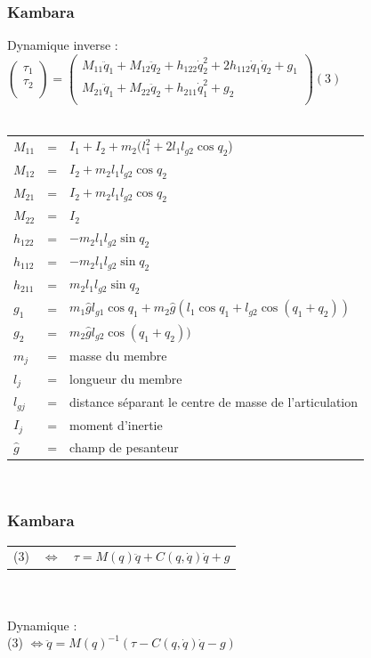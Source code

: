 \documentclass{beamer}
\begin{document}
\begin{frame}
\frametitle{Kambara}
Dynamique inverse : \\
$
\begin{pmatrix}
    \tau_1 \\
    \tau_2 \\
\end{pmatrix}
=
\begin{pmatrix}
    M_{11}\ddot{q}_1 + M_{12}\ddot{q}_2 + h_{122}\dot{q}_2^2 + 2h_{112}\dot{q}_1\dot{q}_2 + g_1 \\
    M_{21}\ddot{q}_1 + M_{22}\ddot{q}_2 + h_{211}\dot{q}_1^2 + g_2 \\
\end{pmatrix}
(3)$\\
~\\
\begin{tabular}{lcl}
    $M_{11}$ & = & $I_1 + I_2 + m_2(l_1^2 + 2 l_1 l_{g2}\cos q_2$) \\
    $M_{12}$ & = & $I_2 + m_2l_1l_{g2}\cos q_2$ \\
    $M_{21}$ & = & $I_2 + m_2l_1l_{g2}\cos q_2$ \\
    $M_{22}$ & = & $I_2$ \\
    $h_{122}$ & = & $-m_2 l_1 l_{g2} \sin q_2$ \\
    $h_{112}$ & = & $-m_2 l_1 l_{g2} \sin q_2$ \\
    $h_{211}$ & = & $m_2 l_1 l_{g2} \sin q_2$ \\
    $g_1$ & = & $m_1 \hat{g} l_{g1} \cos q_1 + m_2 \hat{g} (l_1 \cos q_1 + l_{g2} \cos(q_1 + q_2))$ \\
    $g_2$ & = & $m_2 \hat{g} l_{g2} \cos(q_1 + q_2))$ \\
    $m_j$ & = & masse du membre \\
    $l_j$ & = & longueur du membre \\
    $l_{gj}$ & = & distance séparant le centre de masse de l'articulation \\
    $I_{j}$ & = & moment d'inertie \\
    $\hat{g}$ & = & champ de pesanteur \\
\end{tabular}\\
\end{frame}

\begin{frame}
\frametitle{Kambara}
\begin{tabular}{lcl}
    (3) & $\Leftrightarrow$ & $\tau = M(q)\ddot{q} + C(q, \dot{q}) \dot{q} + g$ \\
\end{tabular}\\
~\\
Dynamique :\\
(3) $\Leftrightarrow \ddot{q} = M(q)^{-1} (\tau - C(q, \dot{q}) \dot{q} - g) $
\end{frame}
\end{document}
